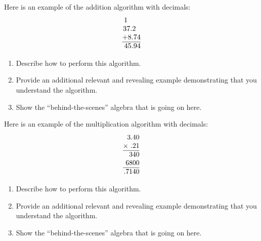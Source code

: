 \documentclass[nooutcomes]{ximera}
\begin{document}
\begin{problem}Here is an example of the addition algorithm with decimals:
\[
\begin{array}{@{}r@{}}
1\hspace*{4.2ex}\\
37.2~~\\
+8.74\\ \hline
45.94
\end{array}
\]
\begin{enumerate}
\item Describe how to perform this algorithm.
\item Provide an additional relevant and revealing example
  demonstrating that you understand the algorithm.
\item Show the ``behind-the-scenes'' algebra that is going on here.
\end{enumerate}
\end{problem} 

\begin{problem}Here is an example of the multiplication algorithm with
  decimals:
\[
\begin{array}{@{}r@{}}
3.40\\
\times~.21\\ \hline
340\\
6800\\
\hline
.7140
\end{array}
\]
\begin{enumerate}
\item Describe how to perform this algorithm.
\item Provide an additional relevant and revealing example
  demonstrating that you understand the algorithm.
\item Show the ``behind-the-scenes'' algebra that is going on here.
\end{enumerate}
\end{problem} 
\end{document}
